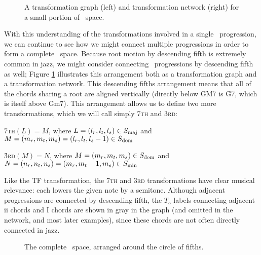 \begin{figure}[thbp]
  \caption[A transformation graph and network for a small portion of \tf\
    space]{A transformation graph (left) and transformation network (right)
    for a small portion of \tf\ space.}
  \label{tf:trans-graph-large}
\end{figure}

With this understanding of the transformations involved in a single \tfo\
progression, we can continue to see how we might connect multiple progressions
in order to form a complete \tf\ space. Because root motion by descending
fifth is extremely common in jazz, we might consider connecting \tfo\
progressions by descending fifth as well; Figure \ref{tf:trans-graph-large}
illustrates this arrangement both as a transformation graph and a
transformation network.  This descending fifths arrangement means that all of
the chords sharing a root are aligned vertically (directly below \h{GM7} is
\h{G7}, which is itself above \h{Gm7}). This arrangement allows us to define
two more transformations, which we will call simply \textsc{7th} and
\textsc{3rd}:

\vspace{0.5\baselineskip}
\h{7}\textsc{th}$(L) = M$, where $L = (l_r, l_t, l_s) \in S_{\mathrm{maj}}$ and $M=(m_r, m_t,
m_s)=(l_r, l_t, l_s-1) \in S_{\mathrm{dom}}$

\h{3}\textsc{rd}$(M) = N$, where $M = (m_r, m_t, m_s) \in S_{\mathrm{dom}}$ and $N=(n_r, n_t,
n_s)=(m_r, m_t-1, m_s) \in S_{\mathrm{min}}$
\vspace{0.5\baselineskip}

\noindent Like the TF transformation, the \textsc{7th} and \textsc{3rd}
transformations have clear musical relevance: each lowers the given note by a
semitone. Although adjacent progressions are connected by descending fifth,
the $T_5$ labels connecting adjacent ii\tsup{7} chords and I\tsup{7} chords
are shown in gray in the graph (and omitted in the network, and most later
examples), since these chords are not often directly connected in jazz.

\begin{figure}[thb]
  \centerGraphic{eps/ch2/tf-circle-fifths.pdf}
  \caption{The complete \tf\ space, arranged around the circle of fifths.}
  \label{tf:tf-circle-fifths}
\end{figure}

